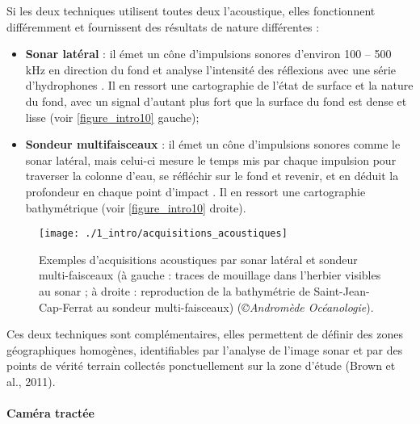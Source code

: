 Si les deux techniques utilisent toutes deux l’acoustique, elles fonctionnent différemment et fournissent des résultats de nature différentes :

\begin{itemize}
    \item \textbf{Sonar latéral} : il émet un cône d’impulsions sonores d’environ 100 – 500 kHz en direction du fond et analyse l’intensité des réflexions avec une série d’hydrophones \citep{brown_benthic_2011}. Il en ressort une cartographie de l’état de surface et la nature du fond, avec un signal d’autant plus fort que la surface du fond est dense et lisse (voir \autoref{figure_intro10} gauche);
    
    \item \textbf{Sondeur multifaisceaux} : il émet un cône d’impulsions sonores comme le sonar latéral, mais celui-ci mesure le temps mis par chaque impulsion pour traverser la colonne d’eau, se réfléchir sur le fond et revenir, et en déduit la profondeur en chaque point d’impact \citep{brown_benthic_2011}. Il en ressort une cartographie bathymétrique (voir \autoref{figure_intro10} droite).
\end{itemize}


\begin{figure}[H]
	\begin{center}
	\texttt{[image: ./1\_intro/acquisitions\_acoustiques]}
		\caption[Exemples d’acquisitions acoustiques par sonar latéral et sondeur multi-faisceaux]{Exemples d’acquisitions acoustiques par sonar latéral et sondeur multi-faisceaux (à gauche : traces de mouillage dans l’herbier visibles au sonar ; à droite : reproduction de la bathymétrie de Saint-Jean-Cap-Ferrat au sondeur multi-faisceaux) (\textit{©Andromède Océanologie}).}
	\label{figure_intro10}
\end{center}
\end{figure}

Ces deux techniques sont complémentaires, elles permettent de définir des zones géographiques homogènes, identifiables par l’analyse de l’image sonar et par des points de vérité terrain collectés ponctuellement sur la zone d’étude (Brown et al., 2011). 

\paragraph{Caméra tractée}

